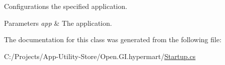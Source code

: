 Configurations the specified application. 


\begin{DoxyParams}{Parameters}
{\em app} & The application.\\
\hline
\end{DoxyParams}


The documentation for this class was generated from the following file\+:\begin{DoxyCompactItemize}
\item 
C\+:/\+Projects/\+App-\/\+Utility-\/\+Store/\+Open.\+G\+I.\+hypermart/\hyperlink{_startup_8cs}{Startup.\+cs}\end{DoxyCompactItemize}
